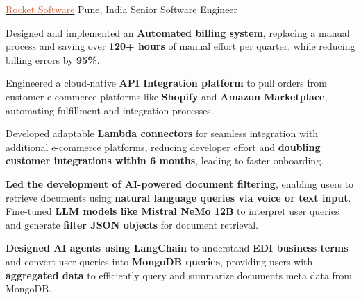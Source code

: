 \documentclass[10pt]{article}
\begin{document}
\headedsection
{\href{https://www.rocketsoftware.com/}{\textcolor{db5c31}{Rocket Software}}}
{Pune, India}
{Senior Software Engineer}
{}{
\vspace{-2.4ex}
\begin{circlist}
    \item Designed and implemented an {\textbf{Automated billing system}}, replacing a manual process and saving over \textbf{120+ hours} of manual effort per quarter, while reducing billing errors by \textbf{95\%}.
    \vspace{1mm}  
    \item Engineered a cloud-native \textbf{API Integration platform} to pull orders from customer e-commerce platforms like \textbf{Shopify} and \textbf{Amazon Marketplace}, automating fulfillment and integration processes.
    \vspace{1mm}  
    \item Developed adaptable \textbf{Lambda connectors} for seamless integration with additional e-commerce platforms, reducing developer effort and \textbf{doubling customer integrations within 6 months}, leading to faster onboarding.
    \vspace{1mm}
    \item \textbf{Led the development of AI-powered document filtering}, enabling users to retrieve documents using \textbf{natural language queries via voice or text input}. Fine-tuned \textbf{LLM models like Mistral NeMo 12B} to interpret user queries and generate \textbf{filter JSON objects} for document retrieval.
    \vspace{1mm}
    \item \textbf{Designed AI agents using LangChain} to understand \textbf{EDI business terms} and convert user queries into \textbf{MongoDB queries}, providing users with \textbf{aggregated data} to efficiently query and summarize documents meta data from MongoDB.
\end{circlist}
}
\end{document}
